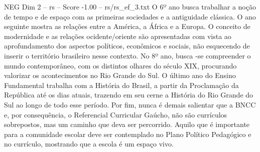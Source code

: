 \begin{textsample}{NEG Dim 2 – rs – Score -1.00 – rs/rs\_ef\_3.txt}
O 6º ano busca trabalhar a noção de tempo e de espaço com as primeiras sociedades e a antiguidade clássica.
O ano seguinte mostra as relações entre a América, a África e a Europa.
O conceito de modernidade e as relações ocidente/oriente são apresentadas com vista ao aprofundamento dos aspectos políticos, econômicos e sociais, não esquecendo de inserir o território brasileiro nesse contexto.
No 8º ano, busca -se compreender o mundo contemporâneo, com os distintos olhares do século XIX, procurando valorizar os acontecimentos no Rio Grande do Sul.
O último ano do Ensino Fundamental trabalha com a História do Brasil, a partir da Proclamação da República até os dias atuais, trazendo em seu cerne a História do Rio Grande do Sul ao longo de todo esse período.
Por fim, nunca é demais salientar que a BNCC e, por consequência, o Referencial Curricular Gaúcho, não são currículos sobrepostos, mas um caminho que deva ser percorrido.
Aquilo que é importante para a comunidade escolar deve ser contemplado no Plano Político Pedagógico e no currículo, mostrando que a escola é um espaço vivo.

\end{textsample}
